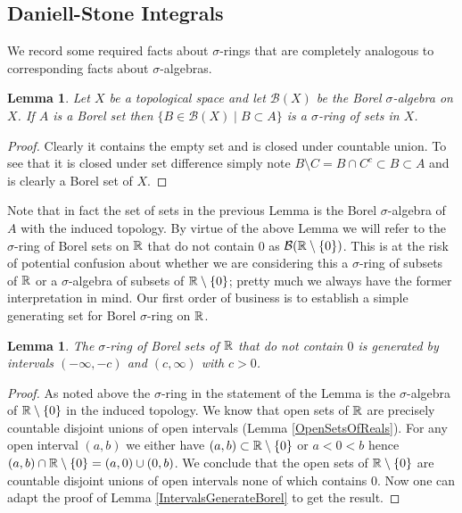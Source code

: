 \documentclass{amsart}
\newtheorem{lem}[thm]{Lemma}
\theoremstyle{remark}
\theoremstyle{definition}
\begin{document}
\subsection{Daniell-Stone Integrals}

We record some required facts about $\sigma$-rings that are completely
analogous to corresponding facts about $\sigma$-algebras.

\begin{lem}Let $X$ be a topological space and let $\mathcal{B}(X)$ be
  the Borel $\sigma$-algebra on $X$.  If $A$ is a Borel set then
  $\lbrace B \in \mathcal{B}(X) \mid B \subset A \rbrace$ is a
  $\sigma$-ring of sets in $X$.
\end{lem}
\begin{proof}
Clearly it contains the empty set and is closed under countable
union.  To see that it is closed under set difference simply note $B
\setminus C = B \cap C^c \subset B \subset A$ and is clearly a Borel
set of $X$.  
\end{proof}
Note that in fact the set of sets in the previous Lemma is the Borel
$\sigma$-algebra of $A$ with the induced topology.
By virtue of the above Lemma we will refer to the $\sigma$-ring of
Borel sets on $\mathbb{R}$ that do not contain $0$ as $\mathcal{B}(\mathbb{R}
\setminus \lbrace 0 \rbrace)$.  This is at the risk of potential
confusion about whether we are considering this a $\sigma$-ring of
subsets of $\mathbb{R}$ or a $\sigma$-algebra of subsets of $\mathbb{R}
\setminus \lbrace 0 \rbrace$; pretty much we always have the former
interpretation in mind.  Our first order of business is to establish a
simple generating set for Borel $\sigma$-ring on $\mathbb{R}$.

\begin{lem}\label{IntervalsGenerateBorelPunctured}The $\sigma$-ring of Borel sets of $\mathbb{R}$ that do not
  contain $0$ is generated by intervals $(-\infty, -c)$ and $(c,
  \infty)$ with $c > 0$.
\end{lem}
\begin{proof}
As noted above the $\sigma$-ring in the statement of the Lemma is the
$\sigma$-algebra of $\mathbb{R} \setminus \lbrace 0 \rbrace$ in the
induced topology.  We know that open sets of $\mathbb{R}$ are precisely
countable disjoint unions of open intervals (Lemma
\ref{OpenSetsOfReals}).  For any open interval $(a,b)$ we either have
$(a,b) \subset \mathbb{R} \setminus \lbrace 0 \rbrace$ or $a < 0 < b$
hence $(a,b) \cap \mathbb{R} \setminus \lbrace 0 \rbrace = (a,0) \cup
(0,b)$.  We conclude that the open sets of $\mathbb{R} \setminus \lbrace 0
\rbrace$ are countable disjoint unions of open intervals none of which
contains $0$.  Now one can adapt the proof of Lemma
\ref{IntervalsGenerateBorel} to get the result.
\end{proof}
\end{document}
